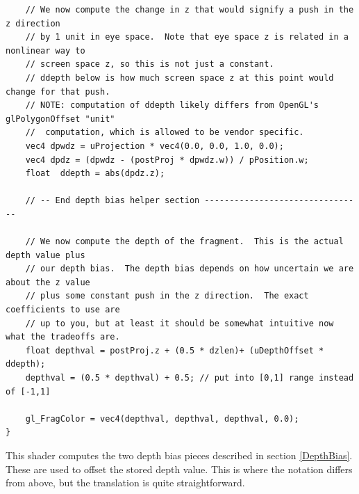 \documentclass[]{article}  %
\begin{document}
\begin{verbatim}
    // We now compute the change in z that would signify a push in the z direction
    // by 1 unit in eye space.  Note that eye space z is related in a nonlinear way to
    // screen space z, so this is not just a constant.  
    // ddepth below is how much screen space z at this point would change for that push.
    // NOTE: computation of ddepth likely differs from OpenGL's glPolygonOffset "unit"
    //  computation, which is allowed to be vendor specific.
    vec4 dpwdz = uProjection * vec4(0.0, 0.0, 1.0, 0.0);
    vec4 dpdz = (dpwdz - (postProj * dpwdz.w)) / pPosition.w;
    float  ddepth = abs(dpdz.z);

    // -- End depth bias helper section --------------------------------   

    // We now compute the depth of the fragment.  This is the actual depth value plus
    // our depth bias.  The depth bias depends on how uncertain we are about the z value
    // plus some constant push in the z direction.  The exact coefficients to use are
    // up to you, but at least it should be somewhat intuitive now what the tradeoffs are.
    float depthval = postProj.z + (0.5 * dzlen)+ (uDepthOffset * ddepth);
    depthval = (0.5 * depthval) + 0.5; // put into [0,1] range instead of [-1,1] 

    gl_FragColor = vec4(depthval, depthval, depthval, 0.0);
}
\end{verbatim}
This shader computes the two depth bias pieces described in section \ref{DepthBias}.  These are used to offset the stored depth value.  This is where the notation differs from above, but the translation is quite straightforward.
\end{document}
